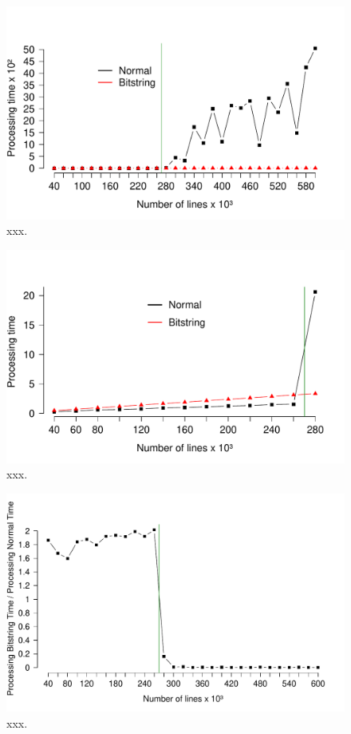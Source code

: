 \documentclass[10pt]{article}
\begin{document}
\begin{figure}[h]
  \centering
  \includegraphics[scale=0.6,clip]{fig42}
  \caption{xxx.}
  \label{fig43}
\end{figure}

\begin{figure}[h]
  \centering
  \includegraphics[scale=0.6,clip]{fig43}
  \caption{xxx.}
  \label{fig43}
\end{figure}

\begin{figure}[h]
  \centering
  \includegraphics[scale=0.6,clip]{fig44}
  \caption{xxx.}
  \label{fig44}
\end{figure}
\end{document}
